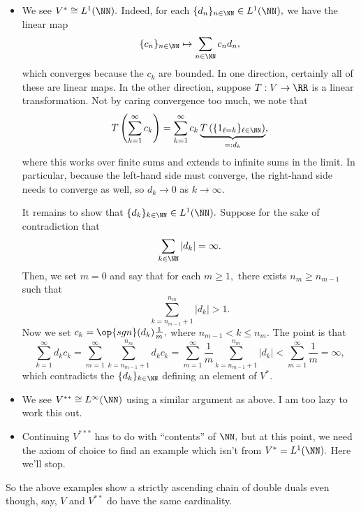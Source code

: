 \begin{itemize}
	\item We see $V^*\cong L^1(\NN).$ Indeed, for each $\{d_n\}_{n\in\NN}\in L^1(\NN),$ we have the linear map
	\[\{c_n\}_{n\in\NN}\mapsto\sum_{n\in\NN}c_nd_n,\]
	which converges because the $c_k$ are bounded. In one direction, certainly all of these are linear maps. In the other direction, suppose $T:V\to\RR$ is a linear transformation. Not by caring convergence too much, we note that
	\[T\left(\sum_{k=1}^\infty c_k\right)=\sum_{k=1}^\infty c_k\underbrace{T\left(\{1_{\ell=k}\}_{\ell\in\NN}\right)}_{=:d_k},\]
	where this works over finite sums and extends to infinite sums in the limit. In particular, because the left-hand side must converge, the right-hand side needs to converge as well, so $d_k\to0$ as $k\to\infty.$

	It remains to show that $\{d_k\}_{k\in\NN}\in L^1(\NN).$ Suppose for the sake of contradiction that
	\[\sum_{k\in\NN}|d_k|=\infty.\]
	Then,  we set $m=0$ and say that for each $m\ge1,$ there exists $n_m\ge n_{m-1}$ such that
	\[\sum_{k=n_{m-1}+1}^{n_m}|d_k|>1.\]
	Now we set $c_k=\op{sgn}(d_k)\frac1m,$ where $n_{m-1}<k\le n_m.$ The point is that
	\[\sum_{k=1}^\infty d_kc_k=\sum_{m=1}^\infty\sum_{k=n_{m-1}+1}^{n_m}d_kc_k=\sum_{m=1}^\infty\frac1m\sum_{k=n_{m-1}+1}^{n_m}|d_k|<\sum_{m=1}^\infty\frac1m=\infty,\]
	which contradicts the $\{d_k\}_{k\in\NN}$ defining an element of $V^*.$
	\item We see $V^{**}\cong L^\infty(\NN)$ using a similar argument as above. I am too lazy to work this out.

	\item Continuing $V^{***}$ has to do with ``contents'' of $\NN,$ but at this point, we need the axiom of choice to find an example which isn't from $V^*=L^1(\NN).$ Here we'll stop.
\end{itemize}
So the above examples show a strictly ascending chain of double duals even though, say, $V$ and $V^{**}$ do have the same cardinality.

